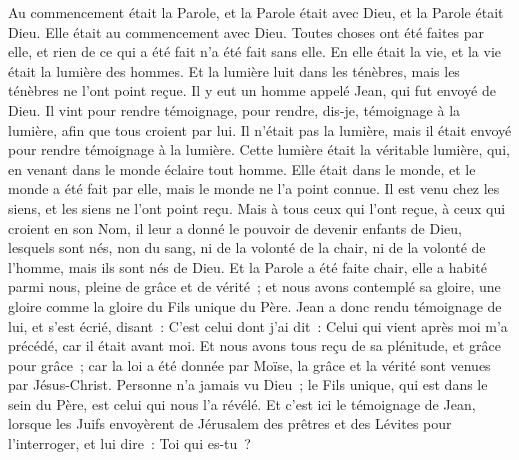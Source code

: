 \begin{multicols}{2}
\VerseOne{}Au commencement était la Parole, et la Parole était avec Dieu, et la Parole était Dieu.
Elle était au commencement avec Dieu.
Toutes choses ont été faites par elle, et rien de ce qui a été fait n'a été fait sans elle.
En elle était la vie, et la vie était la lumière des hommes.
Et la lumière luit dans les ténèbres, mais les ténèbres ne l'ont point reçue.
Il y eut un homme appelé Jean, qui fut envoyé de Dieu.
Il vint pour rendre témoignage, pour rendre, dis-je, témoignage à la lumière, afin que tous croient par lui.
Il n'était pas la lumière, mais il était envoyé pour rendre témoignage à la lumière.
Cette lumière était la véritable lumière, qui, en venant dans le monde éclaire tout homme.
Elle était dans le monde, et le monde a été fait par elle, mais le monde ne l'a point connue.
Il est venu chez les siens, et les siens ne l'ont point reçu.
Mais à tous ceux qui l'ont reçue, à ceux qui croient en son Nom, il leur a donné le pouvoir de devenir enfants de Dieu,
lesquels sont nés, non du sang, ni de la volonté de la chair, ni de la volonté de l'homme, mais ils sont nés de Dieu.
Et la Parole a été faite chair, elle a habité parmi nous, pleine de grâce et de vérité~; et nous avons contemplé sa gloire, une gloire comme la gloire du Fils unique du Père.
Jean a donc rendu témoignage de lui, et s'est écrié, disant~: C'est celui dont j'ai dit~: Celui qui vient après moi m'a précédé, car il était avant moi.
Et nous avons tous reçu de sa plénitude, et grâce pour grâce~;
car la loi a été donnée par Moïse, la grâce et la vérité sont venues par Jésus-Christ.
Personne n'a jamais vu Dieu~; le Fils unique, qui est dans le sein du Père, est celui qui nous l'a révélé.
Et c'est ici le témoignage de Jean, lorsque les Juifs envoyèrent de Jérusalem des prêtres et des Lévites pour l'interroger, et lui dire~: Toi qui es-tu~?

\end{multicols}
